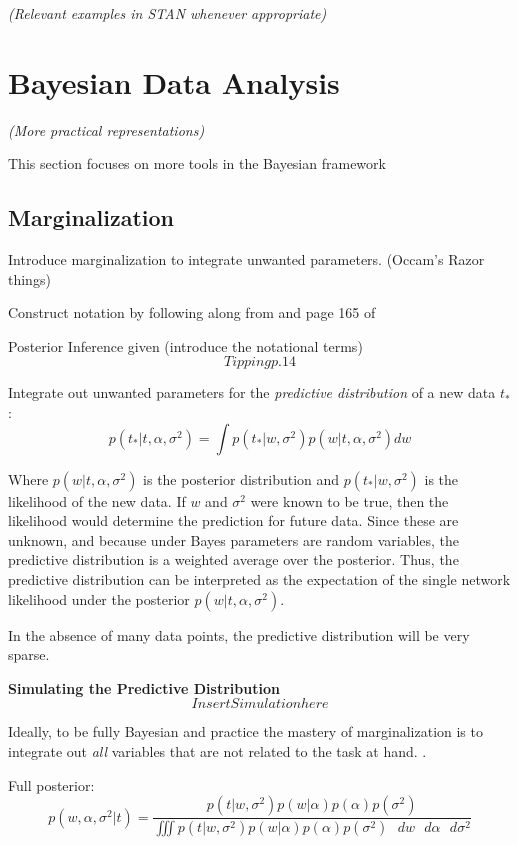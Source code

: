 \textit{(Relevant examples in STAN whenever appropriate)}


\section{Bayesian Data Analysis} %

\textit{(More practical representations)}

This section focuses on more tools in the Bayesian framework

\subsection{Marginalization}

Introduce marginalization to integrate unwanted parameters. (Occam's Razor things)

Construct notation by following along from 
\cite{tipping2004bayesian} and page 165 of \cite{bishop2006pattern}

Posterior Inference given (introduce the notational terms)
$$
Tipping p. 14
$$

Integrate out unwanted parameters for the \textit{predictive distribution} of a new data $t_*$:
$$
p(t_*|t,\alpha,\sigma^2) = \int p(t_*|w,\sigma^2) p(w|t,\alpha,\sigma^2) dw
$$

Where  $p(w|t,\alpha,\sigma^2)$ is the posterior distribution and $p(t_*|w,\sigma^2)$ is the likelihood of the new data.  If $w$ and $\sigma^2$ were known to be true, then the likelihood would determine the prediction for future data.  Since these are unknown, and because under Bayes parameters are random variables, the predictive distribution is a weighted average over the posterior.  Thus, the  predictive distribution can be interpreted as the expectation of the single network likelihood under the posterior $p(w|t,\alpha,\sigma^2)$. \cite{salad}


In the absence of many data points, the predictive distribution will be very sparse. \cite{tipping2004bayesian}


\textbf{Simulating the Predictive Distribution}
$$
Insert Simulationhere
$$

Ideally, to be fully Bayesian and practice the mastery of marginalization is to integrate out \textit{all} variables that are not related to the task at hand. \cite{bishop2006pattern}.

Full posterior:
$$
p(w,\alpha,\sigma^2|t) = \frac{p(t|w,\sigma^2) p(w|\alpha)p(\alpha)p(\sigma^2)}{\iiint p(t|w,\sigma^2)p(w|\alpha)p(\alpha)p(\sigma^2) \text{ } dw \text{ } d\alpha \text{ } d\sigma^2}
$$





